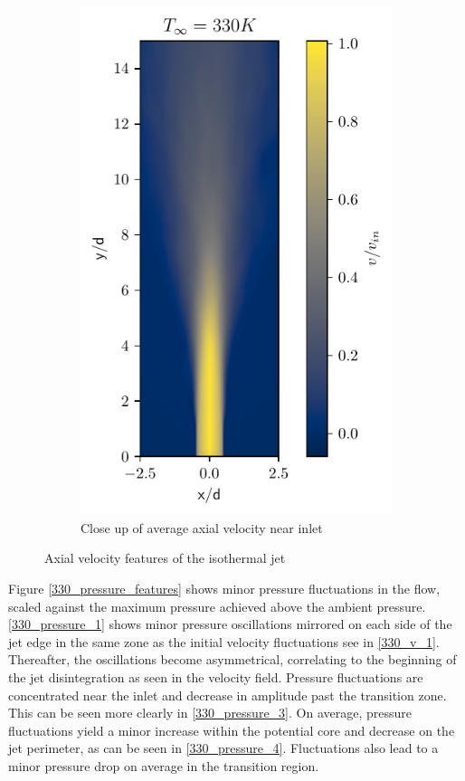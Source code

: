\begin{figure}[htbp!]
\begin{subfigure}{0.25\textwidth}
	\includegraphics[scale=.65]{figures/Plots/vertical/330/v_scaled_vert_avg_330_zoom.pdf}
	\caption{Close up of average axial velocity near inlet} \label{330_v_4}
\end{subfigure}
\caption{Axial velocity features of the isothermal jet}
\label{330_v_features}
\end{figure}

Figure \ref{330_pressure_features} shows minor pressure fluctuations in the flow, scaled against the maximum pressure achieved above the ambient pressure. \ref{330_pressure_1} shows minor pressure oscillations mirrored on each side of the jet edge in the same zone as the initial velocity fluctuations see in \ref{330_v_1}. Thereafter, the oscillations become asymmetrical, correlating to the beginning of the jet disintegration as seen in the velocity field. Pressure fluctuations are concentrated near the inlet and decrease in amplitude past the transition zone. This can be seen more clearly in \ref{330_pressure_3}. On average, pressure fluctuations yield a minor increase within the potential core and decrease on the jet perimeter, as can be seen in \ref{330_pressure_4}. Fluctuations also lead to a minor pressure drop on average in the transition region.  

